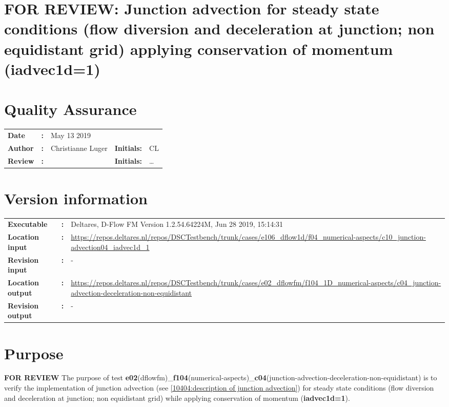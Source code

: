 

\section{FOR REVIEW: Junction advection for steady state conditions (flow diversion and deceleration at junction; non equidistant grid) applying conservation of momentum (iadvec1d=1)}
\newrefsegment

\section*{Quality Assurance}
\begin{tabular}{@{}p{27mm}@{}p{0mm}p{\textwidth-52mm-48pt}p{15mm}p{10mm}}
\textbf{Date} & \textbf{:} &   May 13 2019\\ 
\textbf{Author} & \textbf{:} & Christianne Luger  & \textbf{Initials:} & CL \\
\textbf{Review} & \textbf{:} &   & \textbf{Initials:} & \ldots 
\end{tabular}

\section*{Version information}
{{
\begin{tabular}{@{}p{27mm}@{}p{0mm}p{\textwidth-27mm-24pt}}
\textbf{Executable}   & \textbf{:} & Deltares, D-Flow FM Version 1.2.54.64224M, Jun 28 2019, 15:14:31  \\
\textbf{Location input}     & \textbf{:} & \url{https://repos.deltares.nl/repos/DSCTestbench/trunk/cases/e106_dflow1d/f04_numerical-aspects/c10_junction-advection04_iadvec1d_1} \\
\textbf{Revision input} & \textbf{:} & - \\
\textbf{Location output}     & \textbf{:} & \url{https://repos.deltares.nl/repos/DSCTestbench/trunk/cases/e02_dflowfm/f104_1D_numerical-aspects/c04_junction-advection-deceleration-non-equidistant} \\
\textbf{Revision output} & \textbf{:} & -
\end{tabular}
}}

\section*{Purpose}
\textbf{FOR REVIEW}
The purpose of test \textbf{e02}(dflowfm)\_\textbf{f104}(numerical-aspects)\_\textbf{c04}(junction-advection-deceleration-non-equidistant) is to verify the implementation of junction advection (see \autoref{10404:description of junction advection}) for steady state conditions (flow diversion and deceleration at junction; non equidistant grid) while applying conservation of momentum (\textbf{\textcolor[rgb]{1,0,0}{iadvec1d=1}}).

